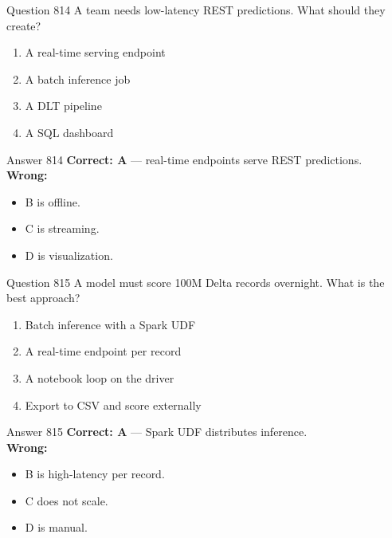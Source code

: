 \documentclass[aspectratio=169,11pt]{beamer}
\begin{document}
	\begin{frame}{Question 814}
		A team needs low-latency REST predictions. What should they create?
		\begin{enumerate}[label=\Alph*.]
			\item A real-time serving endpoint
			\item A batch inference job
			\item A DLT pipeline
			\item A SQL dashboard
		\end{enumerate}
	\end{frame}
	\begin{frame}{Answer 814}
		\textbf{Correct: A} --- real-time endpoints serve REST predictions.\\
		\vspace{0.5em}
		\textbf{Wrong:}
		\begin{itemize}
			\item B is offline.
			\item C is streaming.
			\item D is visualization.
		\end{itemize}
	\end{frame}
	
	\begin{frame}{Question 815}
		A model must score 100M Delta records overnight. What is the best approach?
		\begin{enumerate}[label=\Alph*.]
			\item Batch inference with a Spark UDF
			\item A real-time endpoint per record
			\item A notebook loop on the driver
			\item Export to CSV and score externally
		\end{enumerate}
	\end{frame}
	\begin{frame}{Answer 815}
		\textbf{Correct: A} --- Spark UDF distributes inference.\\
		\vspace{0.5em}
		\textbf{Wrong:}
		\begin{itemize}
			\item B is high-latency per record.
			\item C does not scale.
			\item D is manual.
		\end{itemize}
	\end{frame}
	
\end{document}
